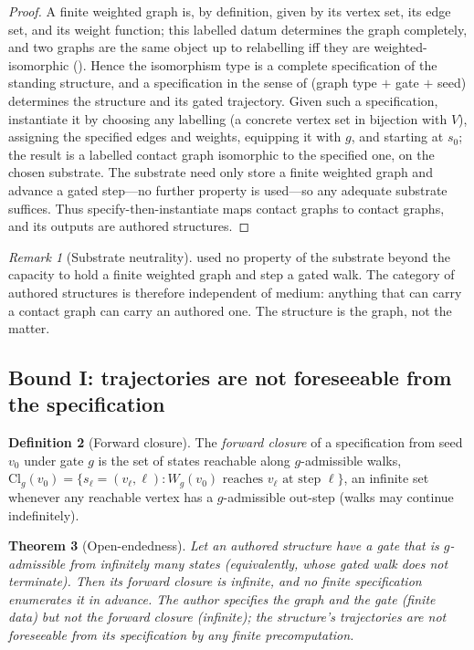 \documentclass[11pt,a4paper]{article}
\theoremstyle{thmstyle}
\newtheorem{theorem}{Theorem}[section]
\theoremstyle{definition}
\newtheorem{definition}[theorem]{Definition}
\theoremstyle{remark}
\newtheorem{remark}[theorem]{Remark}
\newcommand{\V}{V}                        %
\newcommand{\Walk}{W}                     %
\newcommand{\gate}{g}                     %
\begin{document}
\begin{proof}
A finite weighted graph is, by definition, given by its vertex set, its edge
set, and its weight function; this labelled datum determines the graph
completely, and two graphs are the same object up to relabelling iff they are
weighted-isomorphic (). Hence the isomorphism type is a complete
specification of the standing structure, and a specification in the sense of
 (graph type $+$ gate $+$ seed) determines the structure and its
gated trajectory. Given such a specification, instantiate it by choosing any
labelling (a concrete vertex set in bijection with $\V$), assigning the specified
edges and weights, equipping it with $\gate$, and starting at $s_0$; the result
is a labelled contact graph isomorphic to the specified one, on the chosen
substrate. The substrate need only store a finite weighted graph and advance a
gated step---no further property is used---so any adequate substrate suffices.
Thus specify-then-instantiate maps contact graphs to contact graphs, and its
outputs are authored structures.
\end{proof}

\begin{remark}[Substrate neutrality]
\label{rem:substrate}
 used no property of the substrate beyond the capacity
to hold a finite weighted graph and step a gated walk. The category of authored
structures is therefore independent of medium: anything that can carry a contact
graph can carry an authored one. The structure is the graph, not the matter.
\end{remark}

\subsection{Bound I: trajectories are not foreseeable from the specification}

\begin{definition}[Forward closure]
\label{def:forward-closure}
The \emph{forward closure} of a specification from seed $v_0$ under gate $\gate$
is the set of states reachable along $\gate$-admissible walks,
$\mathrm{Cl}_\gate(v_0)=\{s_\ell=(v_\ell,\ell): \Walk_\gate(v_0)\text{ reaches }
v_\ell\text{ at step }\ell\}$, an infinite set whenever any reachable vertex has a
$\gate$-admissible out-step \textup{(}walks may continue indefinitely\textup{)}.
\end{definition}

\begin{theorem}[Open-endedness]
\label{thm:open}
Let an authored structure have a gate that is $\gate$-admissible from infinitely
many states \textup{(}equivalently, whose gated walk does not terminate\textup{)}.
Then its forward closure is infinite, and no finite specification enumerates it
in advance. The author specifies the graph and the gate \textup{(}finite
data\textup{)} but not the forward closure \textup{(}infinite\textup{)}; the
structure's trajectories are not foreseeable from its specification by any finite
precomputation.
\end{theorem}
\end{document}
